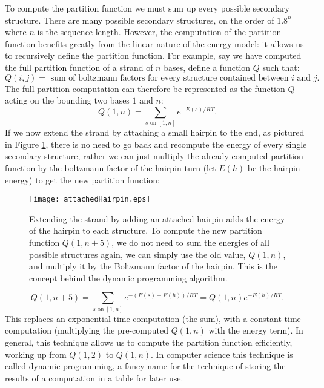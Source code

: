 To compute the partition function we must sum up every possible
secondary structure. There are many possible secondary structures, on
the order of $1.8^n$ where $n$ is the sequence length. However, the
computation of the partition function benefits greatly from the linear
nature of the energy model: it allows us to recursively define the
partition function. For example, say we have computed the full
partition function of a strand of $n$ bases, define a function $Q$
such that:
\begin{equation}
Q(i, j) = \text { sum of boltzmann factors for every structure contained between } i \text{ and } j.
\end{equation}
The full partition computation can therefore be represented as the
function $Q$ acting on the bounding two bases $1$ and $n$: 
\begin{equation}
 Q(1, n) = \sum_{s \text{ on } [1,n]} e^{-E(s)/RT}.
\end{equation}
If we now extend the strand by attaching a small hairpin to the end,
as pictured in Figure \ref{fig:attachedHairpin}, there is no need to
go back and recompute the energy of every single secondary structure,
rather we can just multiply the already-computed partition function by
the boltzmann factor of the hairpin turn (let $E(h)$ be the hairpin
energy) to get the new partition function:
\begin{figure}[h]
\texttt{[image: attachedHairpin.eps]}
\caption{Extending the strand by adding an attached hairpin adds the
  energy of the hairpin to each structure. To compute the new
  partition function $Q(1, n+5)$, we do not need to sum the energies
  of all possible structures again, we can simply use the old value,
  $Q(1,n)$, and multiply it by the Boltzmann factor of the
  hairpin. This is the concept behind the dynamic programming
  algorithm.}
\label{fig:attachedHairpin}
\end{figure}
\begin{equation}
Q(1, n + 5) = \sum_{s \text{ on } [1,n]} e^{-(E(s) + E(h))/RT} = Q(1, n)e^{-E(h)/RT}. 
\end{equation}
This replaces an exponential-time computation (the sum), with a
constant time computation (multiplying the pre-computed $Q(1, n)$ with
the energy term). In general, this technique allows us to compute the
partition function efficiently, working up from $Q(1, 2)$ to
$Q(1,n)$. In computer science this technique is called dynamic
programming, a fancy name for the technique of storing the
results of a computation in a table for later use.

